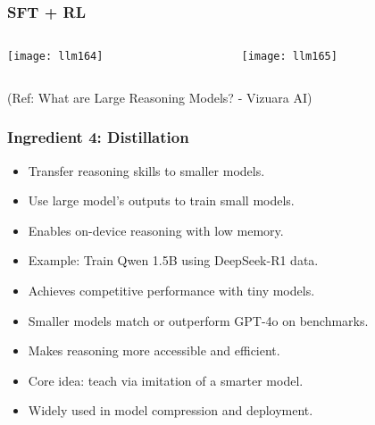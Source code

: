 \begin{frame}[fragile]\frametitle{SFT + RL}


\begin{columns}
    \begin{column}[T]{0.5\linewidth}
		\begin{center}
		\texttt{[image: llm164]}
		\end{center}

    \end{column}
    \begin{column}[T]{0.5\linewidth}
		\begin{center}
		\texttt{[image: llm165]}
		\end{center}
    \end{column}
  \end{columns}
  

{\tiny (Ref: What are Large Reasoning Models? - Vizuara AI)}

\end{frame}

\begin{frame}[fragile]\frametitle{Ingredient 4: Distillation}
\begin{itemize}
  \item Transfer reasoning skills to smaller models.
  \item Use large model’s outputs to train small models.
  \item Enables on-device reasoning with low memory.
  \item Example: Train Qwen 1.5B using DeepSeek-R1 data.
  \item Achieves competitive performance with tiny models.
  \item Smaller models match or outperform GPT-4o on benchmarks.
  \item Makes reasoning more accessible and efficient.
  \item Core idea: teach via imitation of a smarter model.
  \item Widely used in model compression and deployment.
\end{itemize}
\end{frame}

